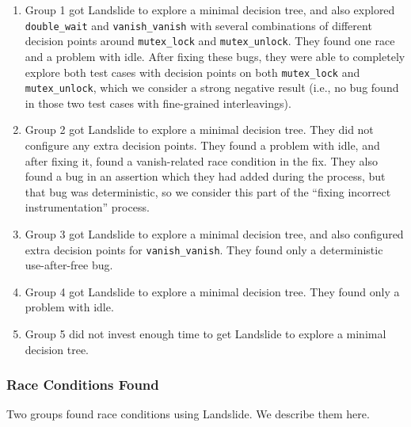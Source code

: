 \begin{enumerate}
	\item %
		Group 1 got Landslide to explore a minimal decision tree, and also explored \texttt{double\_wait} and \texttt{vanish\_vanish} with several combinations of different decision points around \texttt{mutex\_lock} and \texttt{mutex\_unlock}. They found one race and a problem with idle.
		After fixing these bugs, they were able to completely explore both test cases with decision points on both \texttt{mutex\_lock} and \texttt{mutex\_unlock}, which we consider a strong negative result (i.e., no bug found in those two test cases with fine-grained interleavings).
	\item %
		Group 2 got Landslide to explore a minimal decision tree. They did not configure any extra decision points. They found a problem with idle, and after fixing it, found a vanish-related race condition in the fix. They also found a bug in an assertion which they had added during the process, but that bug was deterministic, so we consider this part of the ``fixing incorrect instrumentation'' process.
	\item %
		Group 3 got Landslide to explore a minimal decision tree, and also configured extra decision points for \texttt{vanish\_vanish}. They found only a deterministic use-after-free bug.
	\item %
		Group 4 got Landslide to explore a minimal decision tree. They found only a problem with idle.
	\item %
		Group 5 did not invest enough time to get Landslide to explore a minimal decision tree.
\end{enumerate}

\subsubsection{Race Conditions Found}
\label{sec:eval-victory-races}

Two groups found race conditions using Landslide. We describe them here.

